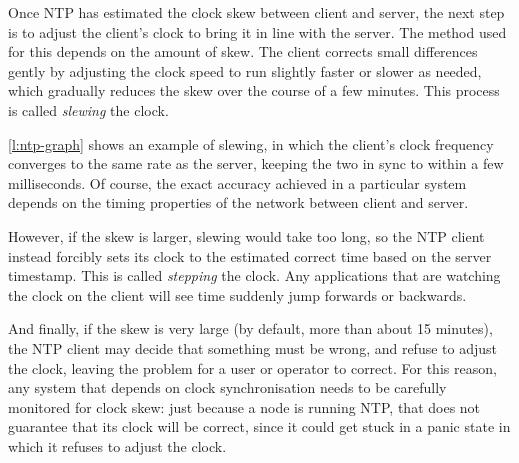 
Once NTP has estimated the clock skew between client and server, the next step is to adjust the client's clock to bring it in line with the server.
The method used for this depends on the amount of skew.
The client corrects small differences gently by adjusting the clock speed to run slightly faster or slower as needed, which gradually reduces the skew over the course of a few minutes.
This process is called \emph{slewing} the clock.

\autoref{l:ntp-graph} shows an example of slewing, in which the client's clock frequency converges to the same rate as the server, keeping the two in sync to within a few milliseconds.
Of course, the exact accuracy achieved in a particular system depends on the timing properties of the network between client and server.

However, if the skew is larger, slewing would take too long, so the NTP client instead forcibly sets its clock to the estimated correct time based on the server timestamp.
This is called \emph{stepping} the clock.
Any applications that are watching the clock on the client will see time suddenly jump forwards or backwards.

And finally, if the skew is very large (by default, more than about 15 minutes), the NTP client may decide that something must be wrong, and refuse to adjust the clock, leaving the problem for a user or operator to correct.
For this reason, any system that depends on clock synchronisation needs to be carefully monitored for clock skew: just because a node is running NTP, that does not guarantee that its clock will be correct, since it could get stuck in a panic state in which it refuses to adjust the clock.

